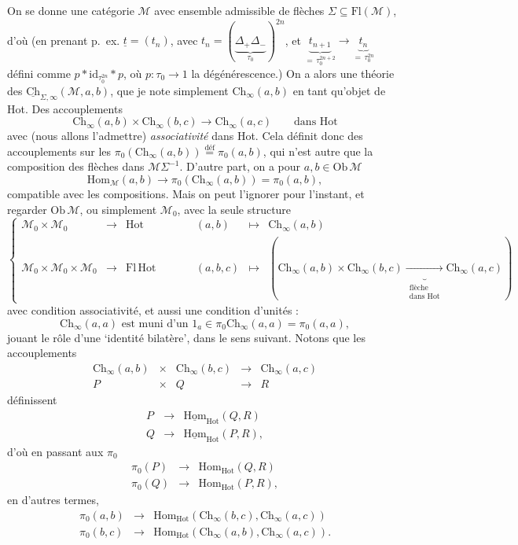 \documentclass[11pt]{article}
\newcommand{\printedpage}[1]{\marginpar{\footnotesize p.~#1}}
\newcommand{\msp}[1]{\marginpar{\footnotesize [#1]}}
\newcommand{\Ch}{\mathrm{Ch}}
\newcommand{\Hot}{\mathrm{Hot}}
\newcommand{\Hom}{\mathrm{Hom}}
\begin{document}
On se donne une catégorie $\mathcal{M}$ avec ensemble admissible de flèches $\Sigma \subseteq \mathrm{Fl}(\mathcal{M})$, d'où (en prenant p.~ex. $\underline{t} = (t_n)$, avec $t_n = (\underbrace{\Delta_+\Delta_-}_{\tau_0})^{2n}$, et $\underbrace{t_{n+1}}_{=\,\tau_0^{2n+2}} \longrightarrow \underbrace{t_n}_{=\,\tau_0^{2n}}$ défini comme $p * \mathrm{id}_{\tau_0^{2n}} * p$, où $p : \tau_0 \longrightarrow 1$ la dégénérescence.) On a alors une théorie des $\underline{\Ch}_{\Sigma,\infty}(\mathcal{M},a,b)$, que je note simplement $\Ch_\infty(a,b)$ en tant qu'objet de Hot. Des accouplements
\[
\Ch_\infty(a,b) \times \Ch_\infty(b,c) \longrightarrow \Ch_\infty(a,c) \qquad \text{dans Hot}
\]
avec (nous allons l'admettre) \textit{associativité} dans Hot. Cela définit donc des accouplements sur les $\pi_0(\Ch_\infty(a,b)) \overset{\text{déf}}{=} \pi_0(a,b)$, qui n'est autre que la composition des flèches dans $\mathcal{M}\Sigma^{-1}$. D'autre part, on a pour $a,b \in \mathrm{Ob}\,\mathcal{M}$
\[
\Hom_{\mathcal{M}}(a,b) \longrightarrow \pi_0(\Ch_\infty(a,b)) = \pi_0(a,b),
\]
compatible avec les compositions. Mais on peut l'ignorer pour l'instant, et regarder $\mathrm{Ob}\,\mathcal{M}$, ou simplement $\mathcal{M}_0$, avec la seule structure
\[
\left\{
\begin{array}{ccccccc}
\mathcal{M}_0 \times \mathcal{M}_0 & \longrightarrow & \Hot & \qquad & (a,b) & \longmapsto & \Ch_\infty(a,b) \\[1ex]
\mathcal{M}_0 \times \mathcal{M}_0 \times \mathcal{M}_0 & \longrightarrow & \mathrm{Fl}\,\Hot & \qquad & (a,b,c) & \longmapsto & (\Ch_\infty(a,b) \times \Ch_\infty(b,c) \underbrace{\longrightarrow}_{\substack{\text{flèche}\\ \text{dans Hot}}} \Ch_\infty(a,c))
\end{array}
\right.
\]
avec condition associativité, et aussi une condition d'unités :
\[
\Ch_\infty(a,a) \text{ est muni d'un } 1_a \in \pi_0\Ch_\infty(a,a) = \pi_0(a,a),
\]
jouant le rôle d'une `identité bilatère', dans le sens suivant. Notons que les accouplements
\[
\begin{array}{ccccc}
\Ch_\infty(a,b) & \times & \Ch_\infty(b,c) & \longrightarrow & \Ch_\infty(a,c) \\[1ex]
P & \times & Q & \longrightarrow & R
\end{array}
\]
\msp{page 2}
définissent
\[
\begin{array}{ccc}
P & \longrightarrow & \underline{\Hom}_{\Hot}(Q,R) \\[1ex]
Q & \longrightarrow & \underline{\Hom}_{\Hot}(P,R),
\end{array}
\]
d'où en passant aux $\pi_0$
\[
\begin{array}{ccc}
\pi_0(P) & \longrightarrow & \Hom_{\Hot}(Q,R) \\[1ex]
\pi_0(Q) & \longrightarrow & \Hom_{\Hot}(P,R),
\end{array}
\]
\printedpage{2}
en d'autres termes,
\[
\begin{array}{ccc}
\pi_0(a,b) & \longrightarrow & \Hom_{\Hot}(\Ch_\infty(b,c),\Ch_\infty(a,c)) \\[1ex]
\pi_0(b,c) & \longrightarrow & \Hom_{\Hot}(\Ch_\infty(a,b),\Ch_\infty(a,c)).
\end{array}
\]
\end{document}
